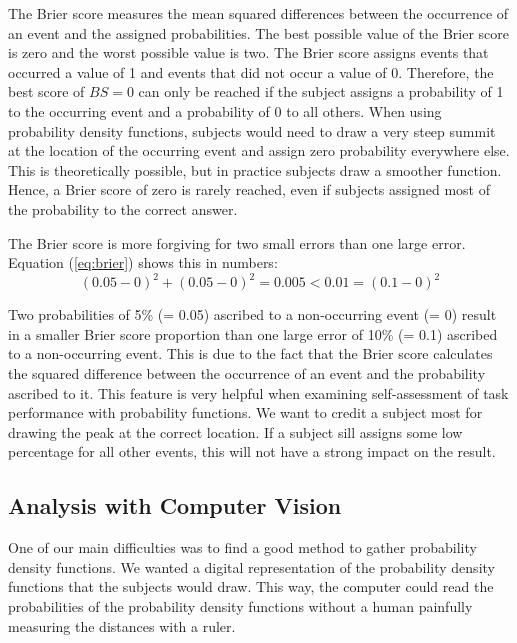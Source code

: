 \documentclass[../main/main.tex]{subfiles}
\begin{document}
	The Brier score measures the mean squared differences between the occurrence of an event and the assigned probabilities. The best possible value of the Brier score is zero and the worst possible value is two. The Brier score assigns events that occurred a value of 1 and events that did not occur a value of 0. Therefore, the best score of $BS = 0$ can only be reached if the subject assigns a probability of 1 to the occurring event and a probability of 0 to all others. When using probability density functions, subjects would need to draw a very steep summit at the location of the occurring event and assign zero probability everywhere else. This is theoretically possible, but in practice subjects draw a smoother function. Hence, a Brier score of zero is rarely reached, even if subjects assigned most of the probability to the correct answer.
	
	The Brier score is more forgiving for two small errors than one large error. Equation (\ref{eq:brier}) shows this in numbers:
	\begin{equation}
		\label{eq:brier}
		(0.05 - 0)^2 + (0.05 - 0)^2 = 0.005 < 0.01 = (0.1 - 0)^2
	\end{equation}
	
	Two probabilities of 5\% (= 0.05) ascribed to a non-occurring event (= 0) result in a smaller Brier score proportion than one large error of 10\% (= 0.1) ascribed to a non-occurring event. This is due to the fact that the Brier score calculates the squared difference between the occurrence of an event and the probability ascribed to it. This feature is very helpful when examining self-assessment of task performance with probability functions. We want to credit a subject most for drawing the peak at the correct location. If a subject sill assigns some low percentage for all other events, this will not have a strong impact on the result.
	
	\subsection{Analysis with Computer Vision}
	\label{sec:computer_vision}
	
	One of our main difficulties was to find a good method to gather probability density functions. We wanted a digital representation of the probability density functions that the subjects would draw. This way, the computer could read the probabilities of the probability density functions without a human painfully measuring the distances with a ruler.
	
\end{document}
